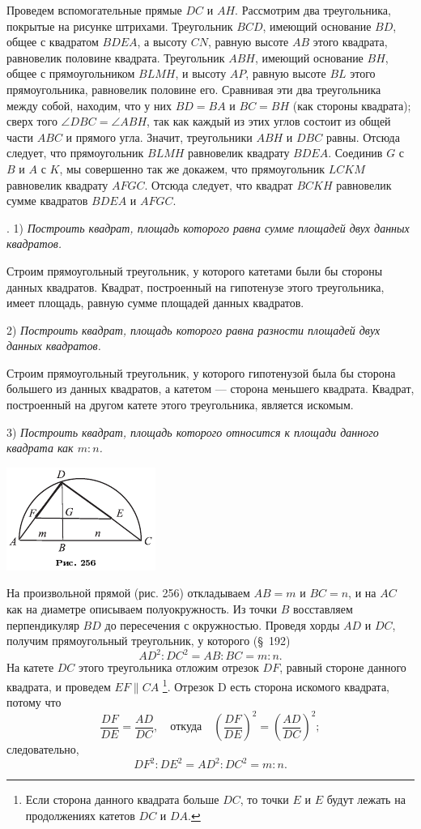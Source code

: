 \documentclass[oneside]{book}
\begin{document}
Проведем вспомогательные прямые $DC$ и $AH$.
Рассмотрим два треугольника, покрытые на рисунке штрихами.
Треугольник $BCD$, имеющий основание $BD$, общее с квадратом $BDEA$, а высоту $CN$, %
равную высоте $AB$ этого квадрата, равновелик половине квадрата.
Треугольник $ABH$, имеющий основание $BH$, общее с прямоугольником $BLMH$, и высоту $AP$, %
равную высоте $BL$ этого прямоугольника, равновелик половине его.
Сравнивая эти два треугольника между собой, находим, что у них $BD = BA$ и $BC=BH$ (как стороны квадрата);
сверх того $\angle DBC=\angle ABH$, так как каждый из этих углов состоит из общей части $ABC$ и прямого угла.
Значит, треугольники $ABH$ и $DBC$ равны.
Отсюда следует, что прямоугольник $BLMH$ равновелик квадрату $BDEA$.
Соединив $G$ с $B$ и $A$ с $K$, мы совершенно так же докажем, что прямоугольник $LCKM$ равновелик квадрату $AFGC$.
Отсюда следует, что квадрат $BCKH$ равновелик сумме квадратов $BDEA$ и $AFGC$.

.
1) \emph{Построить квадрат, площадь которого равна сумме площадей двух данных квадратов.}

Строим прямоугольный треугольник, у которого катетами были бы стороны данных квадратов.
Квадрат, построенный на гипотенузе этого треугольника, имеет площадь, равную сумме площадей данных квадратов.

2) \emph{Построить квадрат, площадь которого равна разности площадей двух данных квадратов.}

Строим прямоугольный треугольник, у которого гипотенузой была бы сторона большего из данных квадратов, а катетом — сторона меньшего квадрата.
Квадрат, построенный на другом катете этого треугольника, является искомым.

3) \emph{Построить квадрат, площадь которого относится к площади данного квадрата как $m:n$.}

\includegraphics{pics/ris-256}

На произвольной прямой (рис. 256) откладываем $AB=m$ и $BC=n$, и на $AC$ как на диаметре описываем полуокружность.
Из точки $B$ восставляем перпендикуляр $BD$ до пересечения с окружностью.
Проведя хорды $AD$ и $DC$, получим прямоугольный треугольник, у которого (§~192)
\[AD^2:DC^2=AB:BC=m:n.\]
На катете $DC$ этого треугольника отложим отрезок $DF$, равный стороне данного квадрата, и проведем $EF\parallel CA$%
\footnote{Если сторона данного квадрата больше $DC$, то точки $E$ и $E$ будут лежать на продолжениях катетов $DC$ и $DA$.}.
Отрезок D есть сторона искомого квадрата, потому что
\[\frac{DF}{DE}=\frac{AD}{DC},\quad\text{откуда}\quad \left(\frac{DF}{DE}\right)^2=\left(\frac{AD}{DC}\right)^2;\]
следовательно,
\[DF^2:DE^2=AD^2:DC^2=m:n.\]
\end{document}
